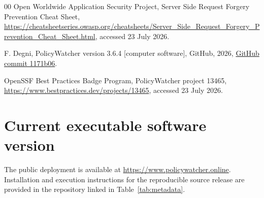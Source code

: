 \documentclass[preprint,12pt,a4paper]{elsarticle}
\begin{document}
\begin{thebibliography}{00}
Open Worldwide Application Security Project, Server Side Request Forgery
Prevention Cheat Sheet, \url{https://cheatsheetseries.owasp.org/cheatsheets/Server_Side_Request_Forgery_Prevention_Cheat_Sheet.html},
accessed 23 July 2026.

F. Degni, PolicyWatcher version 3.6.4 [computer software], GitHub, 2026,
\href{https://github.com/sev7enITA/policywatcher/tree/1171b06a119954343c9a9124df4bdfdc9aab4a6d}{GitHub commit 1171b06}.

OpenSSF Best Practices Badge Program, PolicyWatcher project 13465,
\url{https://www.bestpractices.dev/projects/13465}, accessed 23 July 2026.

\end{thebibliography}

\section*{Current executable software version}

The public deployment is available at \url{https://www.policywatcher.online}.
Installation and execution instructions for the reproducible source release are
provided in the repository linked in Table~\ref{tab:metadata}.
\end{document}
